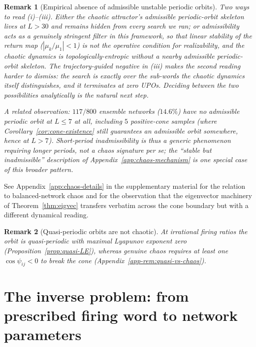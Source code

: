 \documentclass[12pt]{article}
\newtheorem{remark}{Remark}
\begin{document}
\begin{remark}[Empirical absence of admissible unstable periodic orbits]
Two ways to read (i)--(iii). Either the chaotic attractor's admissible periodic-orbit skeleton lives at $L>30$ and remains hidden from every search we ran; or admissibility acts as a genuinely stringent filter in this framework, so that linear stability of the return map ($|\mu_k/\mu_1|<1$) is not the operative condition for realizability, and the chaotic dynamics is topologically-entropic without a nearby admissible periodic-orbit skeleton. The trajectory-guided negative in (iii) makes the second reading harder to dismiss: the search is exactly over the sub-words the chaotic dynamics itself distinguishes, and it terminates at zero UPOs. Deciding between the two possibilities analytically is the natural next step.

A related observation: $117/800$ ensemble networks ($14.6\%$) have no admissible periodic orbit at $L\leq 7$ at all, including $5$ positive-cone samples (where Corollary~\ref{cor:cone-existence} still guarantees an admissible orbit somewhere, hence at $L>7$). Short-period inadmissibility is thus a generic phenomenon requiring longer periods, not a chaos signature per se; the ``stable but inadmissible'' description of Appendix~\ref{app:chaos-mechanism} is one special case of this broader pattern.
\end{remark}

See Appendix~\ref{app:chaos-details} in the supplementary material for the relation to \citet{vreeswijk1996chaos} balanced-network chaos and for the observation that the eigenvector machinery of Theorem~\ref{thm:eigvec} transfers verbatim across the cone boundary but with a different dynamical reading.

\begin{remark}[Quasi-periodic orbits are not chaotic]\label{rem:quasi-vs-chaos} At irrational firing ratios the orbit is quasi-periodic with maximal Lyapunov exponent zero (Proposition~\ref{prop:quasi-LE}), whereas genuine chaos requires at least one $\cos\psi_{ij}<0$ to break the cone (Appendix~\ref{app-rem:quasi-vs-chaos}). \end{remark}


\section{The inverse problem: from prescribed firing word to network parameters}\label{sec:inverse}
\end{document}
